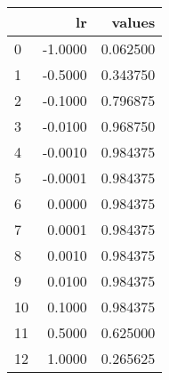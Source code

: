 \begin{tabular}{lrr}
\toprule
{} &      lr &    values \\
\midrule
0  & -1.0000 &  0.062500 \\
1  & -0.5000 &  0.343750 \\
2  & -0.1000 &  0.796875 \\  
3  & -0.0100 &  0.968750 \\
4  & -0.0010 &  0.984375 \\
5  & -0.0001 &  0.984375 \\
6  &  0.0000 &  0.984375 \\
7  &  0.0001 &  0.984375 \\
8  &  0.0010 &  0.984375 \\
9  &  0.0100 &  0.984375 \\
10 &  0.1000 &  0.984375 \\
11 &  0.5000 &  0.625000 \\
12 &  1.0000 &  0.265625 \\
\bottomrule
\end{tabular}
